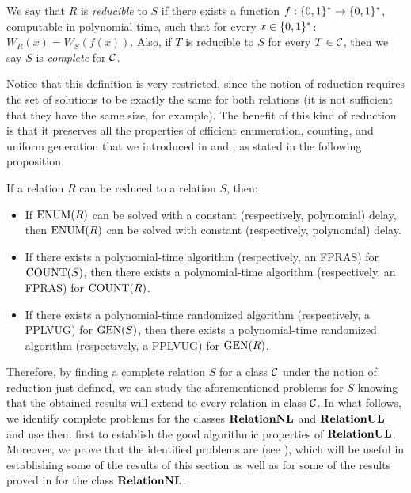 \documentclass[11pt,twoside=off,numbers=noenddot]{scrbook}
\begin{document}
\begin{definition}
    We say that $R$ is \emph{reducible} to $S$ if there exists a function $f : \{ 0, 1 \}^\ast \to \{ 0, 1 \}^\ast$, computable in polynomial time, such that for every $x \in \{ 0, 1 \}^\ast$: $W_R(x) = W_S(f(x))$. Also, if $T$ is reducible to $S$ for every $T \in \mathcal{C}$, then we say $S$ is \emph{complete} for $\mathcal{C}$.
\end{definition}

Notice that this definition is very restricted, since the notion of reduction requires the set of solutions to be exactly the same for both relations (it is not sufficient that they have the same size, for example). The benefit of this kind of reduction is that it preserves all the properties of efficient enumeration, counting, and uniform generation that we introduced in  and , as stated in the following proposition.

\begin{proposition}
    If a relation $R$ can be reduced to a relation $S$, then:
    \begin{itemize}
        \item If $\text{ENUM}(R)$ can be solved with a constant (respectively, polynomial) delay, then $\text{ENUM}(R)$ can be solved with constant (respectively, polynomial) delay.
        \item If there exists a polynomial-time algorithm (respectively, an FPRAS) for $\text{COUNT}(S)$, then there exists a polynomial-time algorithm (respectively, an FPRAS) for $\text{COUNT}(R)$.
        \item If there exists a polynomial-time randomized algorithm (respectively, a PPLVUG) for $\text{GEN}(S)$, then there exists a polynomial-time randomized algorithm (respectively, a PPLVUG) for $\text{GEN}(R)$.
    \end{itemize}
\end{proposition}

Therefore, by finding a complete relation $S$ for a class $\mathcal{C}$ under the notion of reduction just defined, we can study the aforementioned problems for $S$ knowing that the obtained results will extend to every relation in class $\mathcal{C}$. In what follows, we identify complete problems for the classes $\textbf{RelationNL}$ and $\textbf{RelationUL}$ and use them first to establish the good algorithmic properties of $\textbf{RelationUL}$. Moreover, we prove that the identified problems are  (see \cite{jerrum1986random}), which will be useful in establishing some of the results of this section as well as for some of the results proved in  for the class $\textbf{RelationNL}$.
\end{document}

